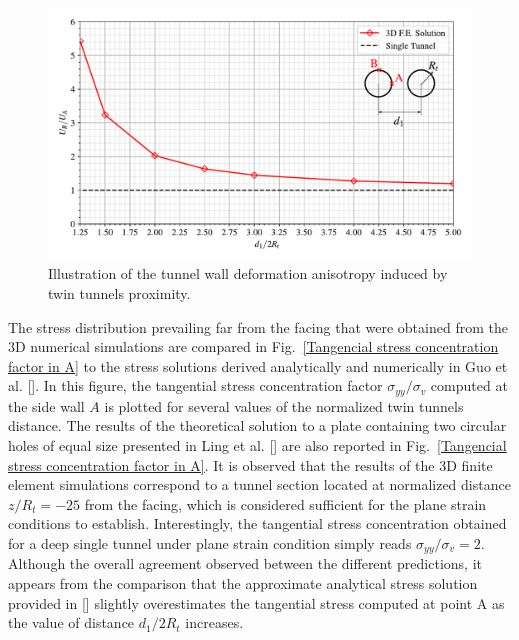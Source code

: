 \documentclass[a4paper,fleqn]{cas-sc}
\begin{document}
\begin{figure}[h!]
	\centering
	\includegraphics[scale=0.65]{Relationship between Convergence in B and A.pdf}
	\caption{Illustration of the tunnel wall deformation anisotropy induced by twin tunnels proximity.}
	\label{Relationship between convergence in B and A}
\end{figure}
\FloatBarrier

The stress distribution prevailing far from the facing that were obtained from the 3D numerical simulations are compared in Fig.~\ref{Tangencial stress concentration factor in A} to the stress solutions derived analytically and numerically in Guo et al. []. In this figure, the tangential stress concentration factor $\sigma_{yy}/\sigma_v$ computed at the side wall $A$ is plotted for several values of the normalized twin tunnels distance. The results of the theoretical solution to a plate containing two circular holes of equal size presented in Ling et al. [] are also reported in Fig.~\ref{Tangencial stress concentration factor in A}. It is observed that the results of the 3D finite element simulations correspond to a tunnel section located at normalized distance $z/R_t = -25$ from the facing, which is considered sufficient for the plane strain conditions to establish. Interestingly, the tangential stress concentration obtained for a deep single tunnel under plane strain condition simply reads $\sigma_{yy}/\sigma_v = 2$. Although the overall agreement observed between the different predictions, it appears from the comparison that the approximate analytical stress solution provided in [] slightly overestimates the tangential stress computed at point A as the value of distance $d_1/2R_t$  increases.
\end{document}
